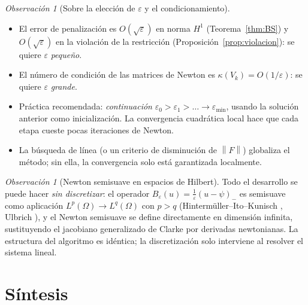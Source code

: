 \documentclass[11pt,a4paper]{article}
\theoremstyle{definition}
\theoremstyle{remark}
\newtheorem{observacion}[teorema]{Observación}
\newcommand{\Norm}[1]{\left\lVert #1 \right\rVert}
\begin{document}
\begin{observación}
\begin{observación}
\begin{observacion}[Sobre la elección de $\varepsilon$ y el condicionamiento]
\leavevmode
\begin{itemize}
\item El error de penalización es $O(\sqrt{\varepsilon})$ en norma $H^1$
(Teorema~\ref{thm:BS}) y $O(\sqrt{\varepsilon})$ en la violación de la
restricción (Proposición~\ref{prop:violacion}): se quiere $\varepsilon$
\emph{pequeño}.
\item El número de condición de las matrices de Newton es
$\kappa(V_k) = O(1/\varepsilon)$: se quiere $\varepsilon$ \emph{grande}.
\item Práctica recomendada: \emph{continuación} $\varepsilon_0 >
\varepsilon_1 > \dots \to \varepsilon_{\min}$, usando la solución anterior
como inicialización. La convergencia cuadrática local hace que cada etapa
cueste pocas iteraciones de Newton.
\item La búsqueda de línea (o un criterio de disminución de
$\Norm{F}$) globaliza el método; sin ella, la convergencia solo está
garantizada localmente.
\end{itemize}
\end{observacion}

\begin{observacion}[Newton semisuave en espacios de Hilbert]
Todo el desarrollo se puede hacer \emph{sin discretizar}: el operador
$B_\varepsilon(u) = \frac{1}{\varepsilon}(u - \psi)_-$ es semisuave como
aplicación $L^p(\Omega) \to L^q(\Omega)$ con $p > q$
(Hinterm\"uller--Ito--Kunisch \cite{HIK02}, Ulbrich \cite{Ulbrich}), y el
Newton semisuave se define directamente en dimensión infinita, sustituyendo
el jacobiano generalizado de Clarke por derivadas newtonianas. La
estructura del algoritmo es idéntica; la discretización
solo interviene al resolver el sistema lineal.
\end{observacion}

\section{Síntesis}


\end{observación}
\end{observación}
\end{document}
